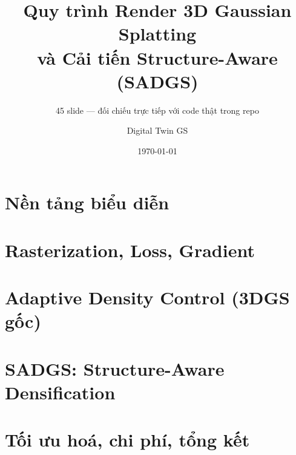 \documentclass[aspectratio=169,9pt]{beamer}
\title[3DGS \& SADGS (45 phút)]{Quy trình Render 3D Gaussian Splatting\\và Cải tiến Structure-Aware (SADGS)}
\subtitle{45 slide — đối chiếu trực tiếp với code thật trong repo}
\author{Digital Twin GS}
\date{\today}
\begin{document}


\section{Nền tảng biểu diễn}



\section{Rasterization, Loss, Gradient}



\section{Adaptive Density Control (3DGS gốc)}


\section{SADGS: Structure-Aware Densification}



\section{Tối ưu hoá, chi phí, tổng kết}


\end{document}
